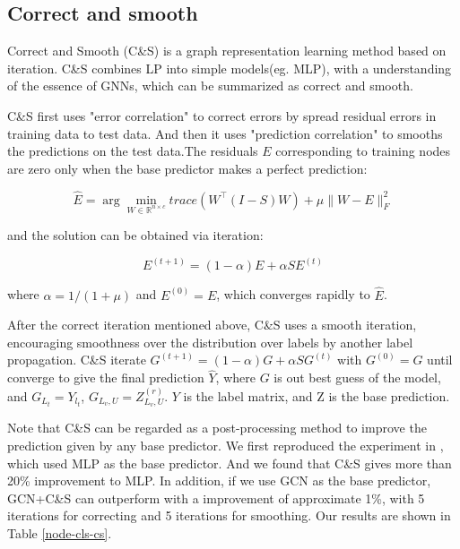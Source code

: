 \documentclass[fleqn,10pt]{SelfArx} %
\begin{document}
\subsection{Correct and smooth}
Correct and Smooth (C\&S)\cite{huang2020combining} is a graph representation learning method based on iteration. C\&S combines LP\cite{zhuѓ2002learning} into simple models(eg. MLP), with a understanding of the essence of GNNs, which can be summarized as correct and smooth.

C\&S first uses "error correlation" to correct errors by spread residual errors in training data to test data. And then it uses "prediction correlation" to smooths the predictions on the test data.The residuals $E$ corresponding to training nodes are zero only when 
the base predictor makes a perfect prediction:
\begin{small}
\begin{equation}
	\hat{E} = \arg \min_{W \in \mathbb{R}^{n\times c}} trace \left(W^{\top} (I-S)W\right) + \mu \|W-E\|_{F}^{2}
\end{equation}
\end{small}
and the solution can be obtained via iteration:
\begin{small}
\begin{equation}
	E^{(t+1)} = (1-\alpha)E + \alpha SE^{(t)}  
\end{equation}
\end{small}
where $\alpha = 1/(1+\mu)$ and $E^{(0)} = E$, which converges rapidly to $\hat{E}$.

After the correct iteration mentioned above, C\&S uses a smooth iteration, encouraging smoothness over the distribution over labels by another label propagation. 
C\&S iterate
$G^{(t+1)} = (1-\alpha)G + \alpha SG^{(t)}$ with $G^{(0)} = G$ until converge to 
give the final prediction $\hat{Y}$, where $G$ is out best guess of the model, and 
$G_{L_{t}} = Y_{l_{t}}$, $G_{L_{v}, U} = Z_{L_{v}, U}^{(r)}$. $Y$ is the label matrix, 
and Z is the base prediction.

Note that C\&S can be regarded as a post-processing method to improve the prediction given by any base predictor. We first reproduced the experiment in \cite{huang2020combining}, which used MLP as the base predictor. And we found that C\&S gives more than 20\% improvement to MLP. In addition, if we use GCN as the base predictor, GCN+C\&S can outperform with a improvement of approximate 1\%, with 5 iterations for correcting and 5 iterations for smoothing. Our results are shown in Table \ref{node-cls-cs}. 
\end{document}

